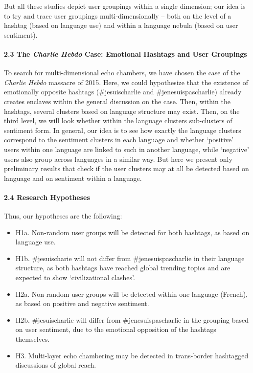 But all these studies depict user groupings within a single dimension; our idea is to try and trace user groupings multi-dimensionally -- both on the level of a hashtag (based on language use) and within a language nebula (based on user sentiment).

\paragraph{2.3 The \textit{Charlie Hebdo} Case: Emotional Hashtags and User Groupings}
To search for multi-dimensional echo chambers, we have chosen the case of the \textit{Charlie Hebdo} massacre of 2015. Here, we could hypothesize that the existence of emotionally opposite hashtags (\#jesuischarlie and \#jenesuispascharlie) already creates enclaves within the general discussion on the case. Then, within the hashtags, several clusters based on language structure may exist. Then, on the third level, we will look whether within the language clusters sub-clusters of sentiment form. In general, our idea is to see how exactly the language clusters correspond to the sentiment clusters in each language and whether ‘positive’ users within one language are linked to such in another language, while ‘negative’ users also group across languages in a similar way. But here we present only preliminary results that check if the user clusters may at all be detected based on language and on sentiment within a language.

\paragraph{2.4 Research Hypotheses}

Thus, our hypotheses are the following:
\begin{itemize}
	\item H1a. Non-random user groups will be detected for both hashtags, as based on
	language use.
	\item H1b. \#jesuischarie will not differ from \#jenesuispascharlie in their language
	structure, as both hashtags have reached global trending topics and are expected to show ‘civilizational clashes’.
	\item H2a. Non-random user groups will be detected within one language (French), as based on positive and negative sentiment.
	\item H2b. \#jesuischarlie will differ from \#jenesuispascharlie in the grouping based on user sentiment, due to the emotional opposition of the hashtags themselves.
	\item H3. Multi-layer echo chambering may be detected in trans-border hashtagged discussions of global reach.
\end{itemize}

